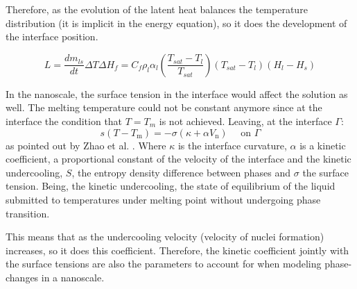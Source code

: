 \noindent Therefore, as the evolution of the latent heat balances the temperature distribution (it is implicit in the energy equation), so it does the development of the interface position.

\begin{equation}
\label{3.50}
L = \frac{d m_{l s}}{d t}\Delta T\Delta H_{f}=C_{f} \rho_{l} \alpha_{l}\left(\frac{T_{s a t}-T_{l}}{T_{s a t}}\right)\left(T_{sat}-T_{l}\right)(H_{l}-H_{s})
\end{equation}

\noindent In the nanoscale, the surface tension in the interface would affect the solution as well. The melting temperature could not be constant anymore since at the interface the condition that $T = T_{m}$ is not achieved. Leaving, at the interface $\Gamma$:
\begin{equation}
s\left(T-T_{\mathrm{m}}\right)=-\sigma\left(\kappa+\alpha V_{\mathrm{n}}\right) \quad \text { on } \Gamma
\label{3.51}
\end{equation}
as pointed out by Zhao et al. \cite{zhao_zhao_xu_2018}. Where $\kappa$ is the interface curvature,  $\alpha$	is a kinetic coefficient, a proportional constant of the velocity of the interface and the kinetic undercooling, $S$, the entropy density difference between phases and $\sigma$ the surface tension. Being, the kinetic undercooling, the state of equilibrium of the liquid submitted to temperatures under melting point without undergoing phase transition. 

\noindent This means that as the undercooling velocity (velocity of nuclei formation) increases, so it does this coefficient. Therefore, the kinetic coefficient jointly with the surface tensions are also the parameters to account for when modeling phase-changes in a nanoscale.